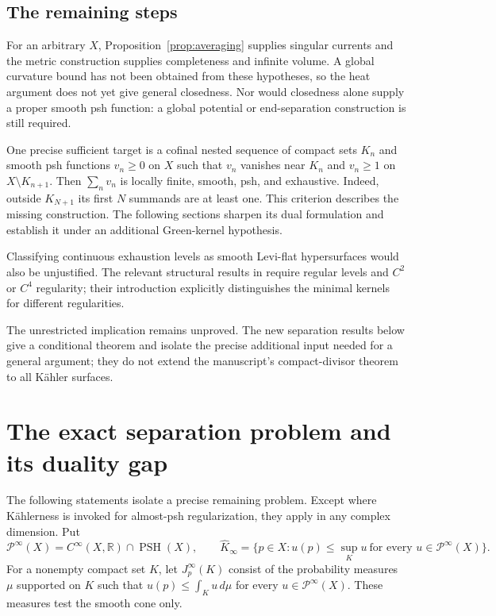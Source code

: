 \documentclass[11pt]{article}
\theoremstyle{remark}
\begin{document}
\subsection*{The remaining steps}
For an arbitrary $X$, Proposition~\ref{prop:averaging} supplies singular currents and the metric construction supplies completeness and infinite volume. A global curvature bound has not been obtained from these hypotheses, so the heat argument does not yet give general closedness. Nor would closedness alone supply a proper smooth psh function: a global potential or end-separation construction is still required.

One precise sufficient target is a cofinal nested sequence of compact sets $K_n$ and smooth psh functions $v_n\ge0$ on $X$ such that $v_n$ vanishes near $K_n$ and $v_n\ge1$ on $X\setminus K_{n+1}$. Then
$\sum_n v_n$ is locally finite, smooth, psh, and exhaustive. Indeed, outside $K_{N+1}$ its first $N$ summands are at least one. This criterion describes the missing construction. The following sections sharpen its dual formulation and establish it under an additional Green-kernel hypothesis.

Classifying continuous exhaustion levels as smooth Levi-flat hypersurfaces would also be unjustified. The relevant structural results in \cite[Theorem~1.1]{BM} require regular levels and $C^2$ or $C^4$ regularity; their introduction explicitly distinguishes the minimal kernels for different regularities.

The unrestricted implication remains unproved. The new separation results below give a conditional theorem and isolate the precise additional input needed for a general argument; they do not extend the manuscript's compact-divisor theorem to all K\"ahler surfaces.


\section{The exact separation problem and its duality gap}\label{sec:separation-duality}

The following statements isolate a precise remaining problem. Except where
K\"ahlerness is invoked for almost-psh regularization, they apply in any
complex dimension. Put
\[
 \mathcal P^\infty(X)=C^\infty(X,\mathbb R)\cap\operatorname{PSH}(X),
 \qquad
 \widehat K_\infty=
 \{p\in X:u(p)\le\sup_Ku\ \text{for every }u\in\mathcal P^\infty(X)\}.
\]
For a nonempty compact set $K$, let $J_p^\infty(K)$ consist of the
probability measures $\mu$ supported on $K$ such that
$u(p)\le\int_Ku\,d\mu$ for every $u\in\mathcal P^\infty(X)$.
These measures test the smooth cone only.
\end{document}
